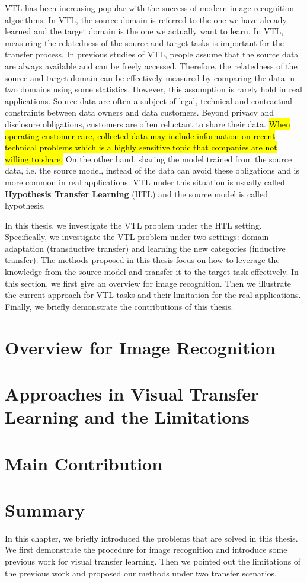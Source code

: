 VTL has been increasing popular with the success of modern image recognition algorithms. In VTL, the source domain is referred to the one we have already learned and the target domain is the one we actually want to learn. In VTL, measuring the relatedness of the source and target tasks is important for the transfer process.
In previous studies of VTL, people assume that the source data are always available and can be freely accessed. Therefore, the relatedness of the source and target domain can be effectively measured by comparing the data in two domains using some statistics. However, this assumption is rarely hold in real applications. Source data are often a subject of legal, technical and contractual constraints between data owners and data customers. Beyond privacy and disclosure obligations, customers are often reluctant to share their data. \hl{When operating customer care, collected data may include information on recent technical problems which is a highly sensitive topic that companies are not willing to share.}
On the other hand, sharing the model trained from the source data, i.e. the source model, instead of the data can avoid these obligations and is more common in real applications. VTL under this situation is usually called \textbf{Hypothesis Transfer Learning} (HTL) \cite{kuzborskij2013stability} and the source model is called hypothesis.

In this thesis, we investigate the VTL problem under the HTL setting. Specifically, we investigate the VTL problem under two settings: domain adaptation (transductive transfer) and learning the new categories (inductive transfer). The methods proposed in this thesis focus on how to leverage the knowledge from the source model and transfer it to the target task effectively. In this section, we first give an overview for image recognition. Then we illustrate the current approach for VTL tasks and their limitation for the real applications. Finally, we briefly demonstrate the contributions of this thesis. 

\section{Overview for Image Recognition}\label{sec:intro:over}

\section{Approaches in Visual Transfer Learning and the Limitations}

\section{Main Contribution}

\section{Summary}
In this chapter, we briefly introduced the problems that are solved in this thesis. We first demonstrate the procedure for image recognition and introduce some previous work for visual transfer learning. Then we pointed out the limitations of the previous work and proposed our methods under two transfer scenarios.